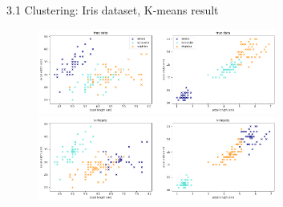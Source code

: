 
\begin{frame}{3.1 Clustering: Iris dataset, K-means result}
  \begin{figure}
    \includegraphics[width=0.7\textwidth]{fig/clusteringTrue.png}
    \includegraphics[width=0.7\textwidth]{fig/clusteringKmeans.png}
  \end{figure}
\end{frame}

